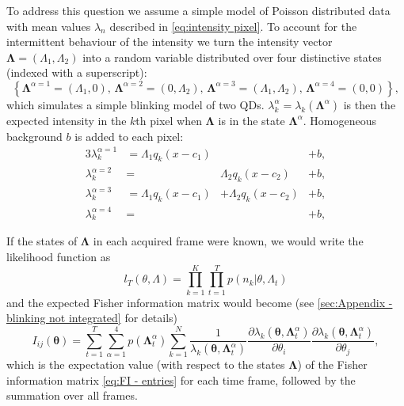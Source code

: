 To address this question we assume a simple model of Poisson distributed data with mean values $\lambda_n$ described in \autoref{eq:intensity pixel}. To account for the intermittent behaviour of the intensity we turn the intensity vector $\bm{\Lambda}=(\Lambda_1,\Lambda_2)$ into a random variable distributed over four distinctive states (indexed with a superscript):
%
\begin{equation*}
	\left\{ \bm{\Lambda}^{\alpha=1}=(\Lambda_1,0),\,\bm{\Lambda}^{\alpha=2}=(0,\Lambda_2),\,\bm{\Lambda}^{\alpha=3}=(\Lambda_1,\Lambda_2),\,\bm{\Lambda}^{\alpha=4}=(0,0)\right\},
\end{equation*}
%
which simulates a simple blinking model of two QDs. $\lambda_k^\alpha=\lambda_k(\bm{\Lambda}^\alpha)$ is then the expected intensity in the $k$th pixel when $\bm{\Lambda}$ is in the state $\bm{\Lambda}^\alpha$. Homogeneous background $b$ is added to each pixel:
%
\begin{alignat}{3}
	\lambda_k^{\alpha=1}&=\Lambda_1q_k(x-c_1) & &+b,\nonumber\\ 
	\lambda_k^{\alpha=2}&=&\Lambda_2q_k(x-c_2) &+b,\nonumber\\ 
	\lambda_k^{\alpha=3}&=\Lambda_1q_k(x-c_1)&+\Lambda_2q_k(x-c_2)&+b,\nonumber\\ 
	\lambda_k^{\alpha=4}&=& &+b,
	\label{eq:lambda states}
\end{alignat}

If the states of $\bm{\Lambda}$ in each acquired frame were known, we would write the likelihood function as 
%
\begin{equation}
	l_T(\theta,\Lambda)=\prod_{k=1}^K\prod_{t=1}^Tp(n_k|\theta,\Lambda_t)
\end{equation}
%
and the expected Fisher information matrix would become (see \autoref{sec:Appendix - blinking not integrated} for details)
%
\begin{equation}
	I_{ij}(\bm{\theta})=\sum_{t=1}^T\sum_{\alpha=1}^4p(\bm{\Lambda}^\alpha_t)\sum_{k=1}^N\frac{1}{\lambda_k(\bm{\theta},\bm{\Lambda}^\alpha_t)}\frac{\partial\lambda_k(\bm{\theta},\bm{\Lambda}^\alpha_t)}{\partial\theta_i}\frac{\partial\lambda_k(\bm{\theta},\bm{\Lambda}^\alpha_t)}{\partial\theta_j},
	\label{eq:Fisher Information Blinking Cheating}
\end{equation}
%
which is the expectation value (with respect to the states $\bm{\Lambda}$) of the Fisher information matrix \autoref{eq:FI - entries} for each time frame, followed by the summation over all frames.


